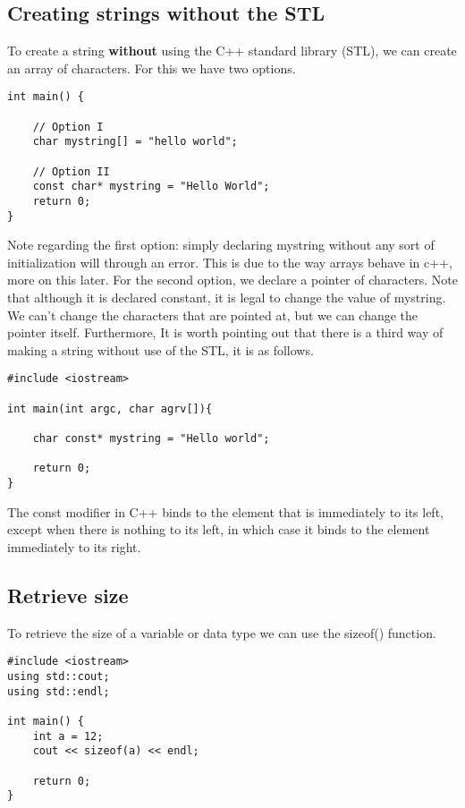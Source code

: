\documentclass{report}
\begin{document}
    \pagebreak \bigbreak \noindent 
    \subsection{Creating strings without the STL}
    To create a string \textbf{without} using the C++ standard library (STL), we can create an array of characters. For this we have two options.
    \bigbreak \noindent 
    \sepline
    \begin{verbatim}
int main() {

    // Option I
    char mystring[] = "hello world";

    // Option II
    const char* mystring = "Hello World";
    return 0;
}
    \end{verbatim}
    \sepline
    \bigbreak \noindent 
    Note regarding the first option: simply declaring mystring without any sort of initialization will through an error. This is due to the way arrays behave in c++, more on this later.
    \bigbreak \noindent 
    For the second option, we declare a pointer of characters. Note that although it is declared constant, it is legal to change the value of mystring. We can't change the characters that are pointed at, but we can change the pointer itself.
    \bigbreak \noindent 
    Furthermore, It is worth pointing out that there is a third way of making a string without use of the STL, it is as follows.
    \bigbreak \noindent 
    \sepline
    \begin{verbatim}
#include <iostream>

int main(int argc, char agrv[]){

    char const* mystring = "Hello world";

    return 0;
}
    \end{verbatim}
    \sepline
    \bigbreak \noindent 
    The const modifier in C++ binds to the element that is immediately to its left, except when there is nothing to its left, in which case it binds to the element immediately to its right.
    \bigbreak \noindent 


    \pagebreak \bigbreak \noindent 
    \subsection{Retrieve size}
    \bigbreak \noindent 
    To retrieve the size of a variable or data type we can use the sizeof() function.
    \bigbreak \noindent 
    \sepline
    \begin{verbatim}
#include <iostream>
using std::cout;
using std::endl;

int main() {
    int a = 12;
    cout << sizeof(a) << endl;

    return 0;
}
    \end{verbatim}
    \sepline
\end{document}
